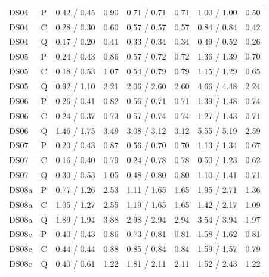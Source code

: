 \documentclass[10pt]{article}
\begin{document}
{\begin{longtable}{llcrcrcr}
\midrule
DS04 & P & 0.42 / 0.45 & 0.90 & 0.71 / 0.71 & 0.71 & 1.00 / 1.00 & 0.50 \\
DS04 & C & 0.28 / 0.30 & 0.60 & 0.57 / 0.57 & 0.57 & 0.84 / 0.84 & 0.42 \\
DS04 & Q & 0.17 / 0.20 & 0.41 & 0.33 / 0.34 & 0.34 & 0.49 / 0.52 & 0.26 \\
\midrule
DS05 & P & 0.24 / 0.43 & 0.86 & 0.57 / 0.72 & 0.72 & 1.36 / 1.39 & 0.70 \\
DS05 & C & 0.18 / 0.53 & 1.07 & 0.54 / 0.79 & 0.79 & 1.15 / 1.29 & 0.65 \\
DS05 & Q & 0.92 / 1.10 & 2.21 & 2.06 / 2.60 & 2.60 & 4.66 / 4.48 & 2.24 \\
\midrule
DS06 & P & 0.26 / 0.41 & 0.82 & 0.56 / 0.71 & 0.71 & 1.39 / 1.48 & 0.74 \\
DS06 & C & 0.24 / 0.37 & 0.73 & 0.57 / 0.74 & 0.74 & 1.27 / 1.43 & 0.71 \\
DS06 & Q & 1.46 / 1.75 & 3.49 & 3.08 / 3.12 & 3.12 & 5.55 / 5.19 & 2.59 \\
\midrule
DS07 & P & 0.20 / 0.43 & 0.87 & 0.56 / 0.70 & 0.70 & 1.13 / 1.34 & 0.67 \\
DS07 & C & 0.16 / 0.40 & 0.79 & 0.24 / 0.78 & 0.78 & 0.50 / 1.23 & 0.62 \\
DS07 & Q & 0.30 / 0.53 & 1.05 & 0.48 / 0.80 & 0.80 & 1.10 / 1.41 & 0.71 \\
\midrule
DS08a & P & 0.77 / 1.26 & 2.53 & 1.11 / 1.65 & 1.65 & 1.95 / 2.71 & 1.36 \\
DS08a & C & 1.05 / 1.27 & 2.55 & 1.19 / 1.65 & 1.65 & 1.42 / 2.17 & 1.09 \\
DS08a & Q & 1.89 / 1.94 & 3.88 & 2.98 / 2.94 & 2.94 & 3.54 / 3.94 & 1.97 \\
\midrule
DS08c & P & 0.40 / 0.43 & 0.86 & 0.73 / 0.81 & 0.81 & 1.58 / 1.62 & 0.81 \\
DS08c & C & 0.44 / 0.44 & 0.88 & 0.85 / 0.84 & 0.84 & 1.59 / 1.57 & 0.79 \\
DS08c & Q & 0.40 / 0.61 & 1.22 & 1.81 / 2.11 & 2.11 & 1.52 / 2.43 & 1.22 \\
\end{longtable}
\vspace{-0.6em}
}
\end{document}
